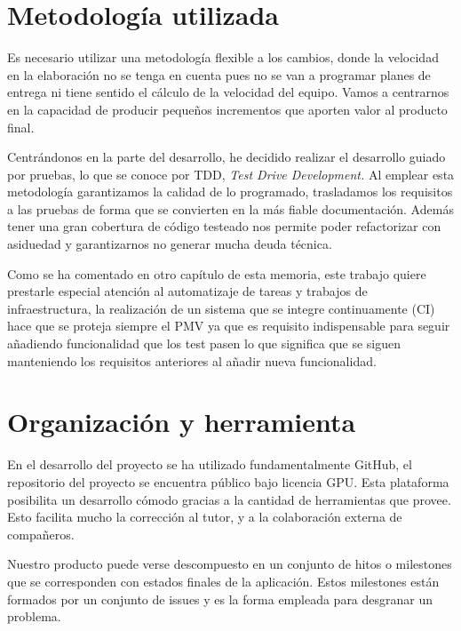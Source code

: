 \section{Metodología utilizada}
Es necesario utilizar una metodología flexible a los cambios, donde la velocidad en la elaboración no se tenga en cuenta 
pues no se van a programar planes de entrega ni tiene sentido el cálculo de la velocidad del equipo. Vamos  a centrarnos en la 
capacidad de producir pequeños incrementos que aporten valor al producto final.

Centrándonos en la parte del desarrollo, he decidido realizar el desarrollo guiado por pruebas, 
lo que se conoce por TDD, \textit{Test Drive Development.} Al emplear esta metodología garantizamos la calidad de 
lo programado, trasladamos los requisitos a las pruebas de forma que se convierten en la más fiable documentación. 
Además tener una gran cobertura de código testeado nos permite poder refactorizar con asiduedad y garantizarnos no generar
mucha deuda técnica.

Como se ha comentado en otro capítulo de esta memoria, este trabajo quiere prestarle especial atención al automatizaje 
de tareas y trabajos de infraestructura, la realización de un sistema que se integre continuamente (CI) hace que se 
proteja siempre el PMV ya que es requisito indispensable para seguir añadiendo funcionalidad que los test pasen lo que 
significa que se siguen manteniendo los requisitos anteriores al añadir nueva funcionalidad.

\section{Organización y herramienta}
En el desarrollo del proyecto se ha utilizado fundamentalmente GitHub, el repositorio del proyecto se encuentra público 
bajo licencia GPU. Esta plataforma posibilita un desarrollo cómodo gracias a la cantidad de herramientas que provee. Esto facilita mucho 
la corrección al tutor, y a la colaboración externa de compañeros.

Nuestro producto puede verse descompuesto en un conjunto de hitos o milestones que se corresponden con estados finales de la aplicación. Estos milestones están formados
por un conjunto de issues y es la forma empleada para desgranar un problema.

